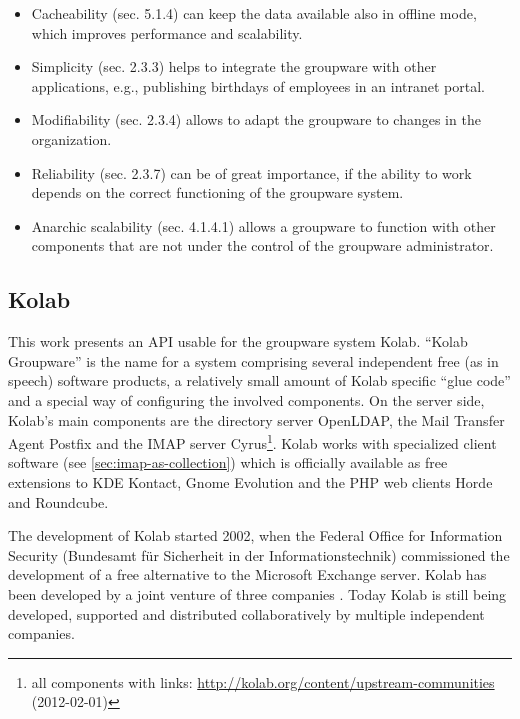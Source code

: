 \documentclass[11pt,a4paper,headsepline,twoside]{scrartcl}		%
\newcommand{\citeurl}[2]{\url{#1} (#2)}
\begin{document}
\begin{itemize}
\item Cacheability (sec. 5.1.4) can keep the data available also in offline
  mode, which improves performance and scalability.
\item Simplicity (sec. 2.3.3) helps to integrate the groupware with other
  applications, e.g., publishing birthdays of employees in an intranet portal.
\item Modifiability (sec. 2.3.4) allows to adapt the groupware to changes in the
  organization.
\item Reliability (sec. 2.3.7) can be of great importance, if the ability to
  work depends on the correct functioning of the groupware system.
\item Anarchic scalability (sec. 4.1.4.1) allows a groupware to function with
  other components that are not under the control of the groupware
  administrator.
\end{itemize}


\subsection{Kolab}
\label{sec:kolab}

This work presents an API usable for the groupware system Kolab. ``Kolab
Groupware'' is the name for a system comprising several independent free (as in
speech) software products, a relatively small amount of Kolab specific ``glue
code'' and a special way of configuring the involved components. On the server
side, Kolab's main components are the directory server OpenLDAP, the Mail
Transfer Agent Postfix and the IMAP server Cyrus\footnote{all components with
  links:
  \citeurl{http://kolab.org/content/upstream-communities}{2012-02-01}}. Kolab
works with specialized client software (see \autoref{sec:imap-as-collection})
which is officially available as free extensions to KDE Kontact, Gnome Evolution
and the PHP web clients Horde and Roundcube.

The development of Kolab started 2002, when the Federal Office for Information
Security (Bundesamt für Sicherheit in der Informationstechnik) commissioned the
development of a free alternative to the Microsoft Exchange server. Kolab has
been developed by a joint venture of three companies \cite{Stoermer2004}. Today
Kolab is still being developed, supported and distributed collaboratively by
multiple independent companies.
\end{document}
